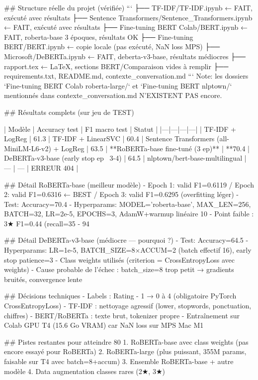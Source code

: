 ## Structure réelle du projet (vérifiée)
```
├── TF-IDF/TF-IDF.ipynb                    ← FAIT, exécuté avec résultats
├── Sentence Transformers/Sentence_Transformers.ipynb  ← FAIT, exécuté avec résultats
├── Fine-tuning BERT Colab/BERT.ipynb      ← FAIT, roberta-base 3 époques, résultats OK
├── Fine-tuning BERT/BERT.ipynb            ← copie locale (pas exécuté, NaN loss MPS)
├── Microsoft/DeBERTa.ipynb               ← FAIT, deberta-v3-base, résultats médiocres
├── rapport.tex                            ← LaTeX, sections BERT/Comparaison vides à remplir
├── requirements.txt, README.md, contexte_conversation.md
```
Note: les dossiers `Fine-tuning BERT Colab roberta-large/` et `Fine-tuning BERT nlptown/` mentionnés dans contexte_conversation.md N'EXISTENT PAS encore.

## Résultats complets (sur jeu de TEST)

| Modèle | Accuracy test | F1 macro test | Statut |
|---|---|---|---|
| TF-IDF + LogReg | 61.3%
| TF-IDF + LinearSVC | 60.4%
| Sentence Transformers (all-MiniLM-L6-v2) + LogReg | 63.5%
| **RoBERTa-base fine-tuné (3 ep)** | **70.4%
| DeBERTa-v3-base (early stop ep ~3-4) | 64.5%
| nlptown/bert-base-multilingual | — | — | ERREUR 404 |

## Détail RoBERTa-base (meilleur modèle)
- Epoch 1: valid F1=0.6119 / Epoch 2: valid F1=0.6316 ← BEST / Epoch 3: valid F1=0.6295 (overfitting léger)
- Test: Accuracy=70.4%
- Hyperparams: MODEL='roberta-base', MAX_LEN=256, BATCH=32, LR=2e-5, EPOCHS=3, AdamW+warmup linéaire 10%
- Point faible : 3★ F1=0.44 (recall=35%
- 94%

## Détail DeBERTa-v3-base (médiocre — pourquoi ?)
- Test: Accuracy=64.5%
- Hyperparams: LR=1e-5, BATCH_SIZE=8×ACCUM=2 (batch effectif 16), early stop patience=3
- Class weights utilisés (criterion = CrossEntropyLoss avec weights)
- Cause probable de l'échec : batch_size=8 trop petit → gradients bruités, convergence lente

## Décisions techniques
- Labels : Rating - 1 → 0 à 4 (obligatoire PyTorch CrossEntropyLoss)
- TF-IDF : nettoyage agressif (lower, stopwords, ponctuation, chiffres)
- BERT/RoBERTa : texte brut, tokenizer propre
- Entraînement sur Colab GPU T4 (15.6 Go VRAM) car NaN loss sur MPS Mac M1

## Pistes restantes pour atteindre 80%
1. RoBERTa-base avec class weights (pas encore essayé pour RoBERTa)
2. RoBERTa-large (plus puissant, 355M params, faisable sur T4 avec batch=8+accum)
3. Ensemble RoBERTa-base + autre modèle
4. Data augmentation classes rares (2★, 3★)

